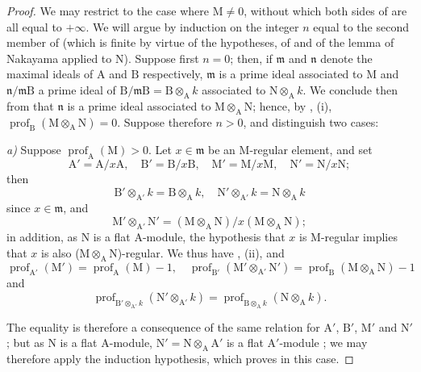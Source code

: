 \begin{proof}
We may restrict to the case where $\mathrm{M}\neq 0$, without which both sides of  are all equal to $+\infty$.
We will argue by induction on the integer $n$ equal to the second member of  (which is finite by virtue of the hypotheses, of  and of the lemma of Nakayama applied to $\mathrm{N}$).
Suppose first $n=0$; then, if $\mathfrak{m}$ and $\mathfrak{n}$ denote the maximal ideals of $\mathrm{A}$ and $\mathrm{B}$ respectively, $\mathfrak{m}$ is a prime ideal associated to $\mathrm{M}$ and $\mathfrak{n}/\mathfrak{m}\mathrm{B}$ a prime ideal of $\mathrm{B}/\mathfrak{m}\mathrm{B}=\mathrm{B}\otimes_\mathrm{A} k$ associated to $\mathrm{N}\otimes_\mathrm{A} k$.
We conclude then from  that $\mathfrak{n}$ is a prime ideal associated to $\mathrm{M}\otimes_\mathrm{A}\mathrm{N}$; hence, by , (i), $\operatorname{prof}_\mathrm{B}(\mathrm{M}\otimes_\mathrm{A}\mathrm{N})=0$.
Suppose therefore $n>0$, and distinguish two cases:

\emph{a)} Suppose $\operatorname{prof}_\mathrm{A}(\mathrm{M})>0$.
Let $x\in\mathfrak{m}$ be an M-regular element, and set
\[
  \mathrm{A}'=\mathrm{A}/x\mathrm{A},\quad\mathrm{B}'=\mathrm{B}/x\mathrm{B},\quad\mathrm{M}'=\mathrm{M}/x\mathrm{M},\quad\mathrm{N}'=\mathrm{N}/x\mathrm{N};
\]
then
\[
  \mathrm{B}'\otimes_{\mathrm{A}'}k=\mathrm{B}\otimes_\mathrm{A} k,\quad \mathrm{N}'\otimes_{\mathrm{A}'}k=\mathrm{N}\otimes_\mathrm{A} k
\]
since $x\in\mathfrak{m}$, and
\[
  \mathrm{M}'\otimes_{\mathrm{A}'}\mathrm{N}'=(\mathrm{M}\otimes_\mathrm{A}\mathrm{N})/x(\mathrm{M}\otimes_\mathrm{A}\mathrm{N});
\]
in addition, as $\mathrm{N}$ is a flat $\mathrm{A}$-module, the hypothesis that $x$ is M-regular implies that $x$ is also ($\mathrm{M}\otimes_\mathrm{A}\mathrm{N}$)-regular.
We thus have , (ii), and 
\[
  \operatorname{prof}_{\mathrm{A}'}(\mathrm{M}')=\operatorname{prof}_\mathrm{A}(\mathrm{M})-1,\quad \operatorname{prof}_{\mathrm{B}'}(\mathrm{M}'\otimes_{\mathrm{A}'}\mathrm{N}')=\operatorname{prof}_\mathrm{B}(\mathrm{M}\otimes_\mathrm{A}\mathrm{N})-1
\]
and
\[
  \operatorname{prof}_{\mathrm{B}'\otimes_{\mathrm{A}'}k}(\mathrm{N}'\otimes_{\mathrm{A}'}k)=\operatorname{prof}_{\mathrm{B}\otimes_\mathrm{A} k}(\mathrm{N}\otimes_\mathrm{A} k).
\]

The equality  is therefore a consequence of the same relation for $\mathrm{A}'$, $\mathrm{B}'$, $\mathrm{M}'$ and $\mathrm{N}'$; but as $\mathrm{N}$ is a flat $\mathrm{A}$-module, $\mathrm{N}'=\mathrm{N}\otimes_\mathrm{A}\mathrm{A}'$ is a flat $\mathrm{A}'$-module ; we may therefore apply the induction hypothesis, which proves  in this case.


\end{proof}
